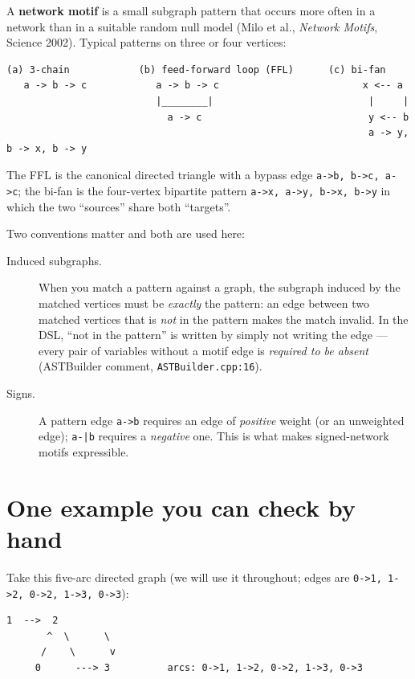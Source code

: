 \documentclass[11pt,a4paper]{article}
\newcommand{\code}[1]{\texttt{#1}}
\newcommand{\file}[1]{\texttt{#1}}
\begin{document}
A \textbf{network motif} is a small subgraph pattern that occurs more often in a
network than in a suitable random null model (Milo et al., \emph{Network Motifs},
Science 2002). Typical patterns on three or four vertices:

\begin{lstlisting}[style=plain]
  (a) 3-chain            (b) feed-forward loop (FFL)      (c) bi-fan
   a -> b -> c            a -> b -> c                         x <-- a
                          |________|                           |     |
                            a -> c                             y <-- b
                                                               a -> y, b -> x, b -> y
\end{lstlisting}

The FFL is the canonical directed triangle with a bypass edge
\code{a->b, b->c, a->c}; the bi-fan is the four-vertex bipartite pattern
\code{a->x, a->y, b->x, b->y} in which the two ``sources'' share both
``targets''.

Two conventions matter and both are used here:

\begin{description}
  \item[Induced subgraphs.] When you match a pattern against a graph, the
  subgraph induced by the matched vertices must be \emph{exactly} the pattern:
  an edge between two matched vertices that is \emph{not} in the pattern makes
  the match invalid. In the DSL, ``not in the pattern'' is written by simply not
  writing the edge --- every pair of variables without a motif edge is
  \emph{required to be absent} (ASTBuilder comment, \file{ASTBuilder.cpp:16}).
  \item[Signs.] A pattern edge \code{a->b} requires an edge of \emph{positive}
  weight (or an unweighted edge); \code{a-|b} requires a \emph{negative} one.
  This is what makes signed-network motifs expressible.
\end{description}

\section{One example you can check by hand}
\label{sec:hand}

Take this five-arc directed graph (we will use it throughout; edges are
\code{0->1, 1->2, 0->2, 1->3, 0->3}):

\begin{lstlisting}[style=plain]
        1  -->  2
       ^  \      \
      /    \      v
     0      ---> 3          arcs: 0->1, 1->2, 0->2, 1->3, 0->3
\end{lstlisting}
\end{document}
